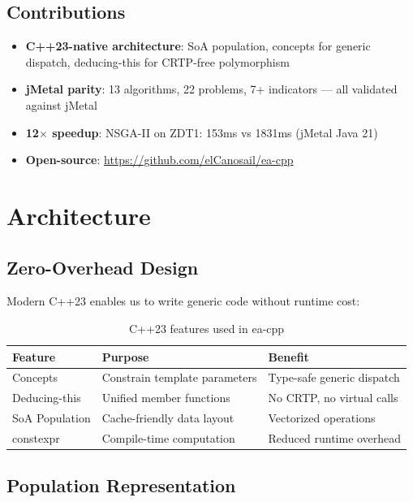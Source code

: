 \documentclass[10pt,a4paper]{article}
\begin{document}
\subsection{Contributions}

\begin{itemize}
    \item \textbf{C++23-native architecture}: SoA population, concepts for generic dispatch, deducing-this for CRTP-free polymorphism
    \item \textbf{jMetal parity}: 13 algorithms, 22 problems, 7+ indicators --- all validated against jMetal
    \item \textbf{12$\times$ speedup}: NSGA-II on ZDT1: 153ms vs 1831ms (jMetal Java 21)
    \item \textbf{Open-source}: \url{https://github.com/elCanosail/ea-cpp}
\end{itemize}

\section{Architecture}

\subsection{Zero-Overhead Design}

Modern C++23 enables us to write generic code without runtime cost:

\begin{table}[h]
\centering
\caption{C++23 features used in ea-cpp}
\label{tab:features}
\begin{tabular}{@{}lll@{}}
\toprule
\textbf{Feature} & \textbf{Purpose} & \textbf{Benefit} \\
\midrule
Concepts & Constrain template parameters & Type-safe generic dispatch \\
Deducing-this & Unified member functions & No CRTP, no virtual calls \\
SoA Population & Cache-friendly data layout & Vectorized operations \\
constexpr & Compile-time computation & Reduced runtime overhead \\
\bottomrule
\end{tabular}
\end{table}

\subsection{Population Representation}
\end{document}
